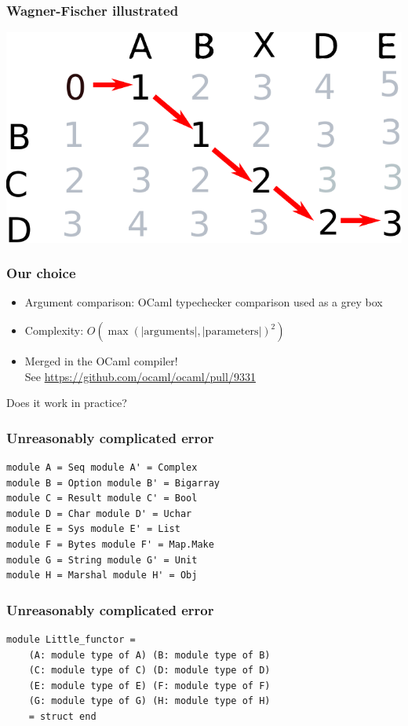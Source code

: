 \documentclass[11pt,aspectratio=169]{beamer}
\begin{document}
\begin{frame}[fragile]\frametitle{Wagner-Fischer illustrated}
   \centering \includegraphics{matrix.pdf}
\end{frame}

\begin{frame}\frametitle{Our choice}
  \begin{itemize}
    \item Argument comparison: OCaml typechecker comparison used as a grey box
    \item Complexity: $O(\max(\mathrm{|arguments|,|parameters|})^2)$
    \item Merged in the OCaml compiler!\\
      See \url{https://github.com/ocaml/ocaml/pull/9331} 
  \end{itemize}
\end{frame}


\begin{frame}[standout]
  \centering \Huge Does it work in practice?
\end{frame}



\begin{frame}[fragile]\frametitle{Unreasonably complicated error}
\begin{verbatim}
module A = Seq module A' = Complex
module B = Option module B' = Bigarray
module C = Result module C' = Bool
module D = Char module D' = Uchar
module E = Sys module E' = List
module F = Bytes module F' = Map.Make
module G = String module G' = Unit
module H = Marshal module H' = Obj
\end{verbatim}
\end{frame}
\begin{frame}[fragile]\frametitle{Unreasonably complicated error}
\begin{verbatim}
module Little_functor =
    (A: module type of A) (B: module type of B)
    (C: module type of C) (D: module type of D)
    (E: module type of E) (F: module type of F)
    (G: module type of G) (H: module type of H)
    = struct end
\end{verbatim}
\end{frame}
\end{document}

